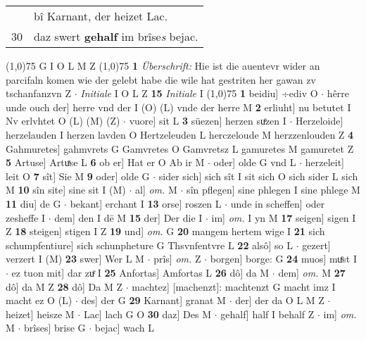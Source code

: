\documentclass[8pt,a4paper,notitlepage]{article}
\begin{document}
\begin{table}[ht]
\begin{minipage}[t]{0.5\linewidth}
\begin{tabular}{rl}
 & bî Karnant, der heizet Lac.\\ 
30 & daz swert \textbf{gehalf} im brîse\textit{s} bejac.\\ 
\end{tabular}
\scriptsize
\line(1,0){75} \newline
G I O L M Z \newline
\line(1,0){75} \newline
\textbf{1} \textit{Überschrift:} Hie ist die auentevr wider an parcifaln komen wie der gelebt habe die wile hat gestriten her gawan zv tschanfanzvn Z   $\cdot$ \textit{Initiale} I O L Z  \textbf{15} \textit{Initiale} I  \newline
\line(1,0){75} \newline
\textbf{1} beidiu] ÷ediv O  $\cdot$ hêrre unde ouch der] herre vnd der I (O) (L) vnde der herre M \textbf{2} erliuht] nu betutet I Nv erlvhtet O (L) (M) (Z)  $\cdot$ vuore] sit L \textbf{3} süezen] herzen suͤzen I  $\cdot$ Herzeloide] herzelauden I herzen lavden O Hertzeleuden L herczeloude M herzzenlouden Z \textbf{4} Gahmuretes] gahmvrets G Gamvretes O Gamvretsz L gamuretes M gamuretet Z \textbf{5} Artuse] Artuͯse L \textbf{6} ob er] Hat er O Ab ir M  $\cdot$ oder] olde G vnd L  $\cdot$ herzeleit] leit O \textbf{7} sît] Sie M \textbf{9} oder] olde G  $\cdot$ sider sich] sich sît I sit sich O sich sider L sich M \textbf{10} sîn site] sine sit I (M)  $\cdot$ al] \textit{om.} M  $\cdot$ sîn pflegen] sine phlegen I sine phlege M \textbf{11} diu] de G  $\cdot$ bekant] erchant I \textbf{13} orse] roszen L  $\cdot$ unde in scheffen] oder zesheffe I  $\cdot$ dem] den I dē M \textbf{15} der] Der die I  $\cdot$ im] \textit{om.} I yn M \textbf{17} seigen] sigen I Z \textbf{18} steigen] stigen I Z \textbf{19} und] \textit{om.} G \textbf{20} mangem hertem wige I \textbf{21} sich schumpfentiure] sich schunpheture G Thsvnfentvre L \textbf{22} alsô] so L  $\cdot$ gezert] verzert I (M) \textbf{23} swer] Wer L M  $\cdot$ prîs] \textit{om.} Z  $\cdot$ borgen] borge: G \textbf{24} muos] muͤst I  $\cdot$ ez tuon mit] dar zuͤ I \textbf{25} Anfortas] Amfortas L \textbf{26} dô] da M  $\cdot$ dem] \textit{om.} M \textbf{27} dô] da M Z \textbf{28} dô] Da M Z  $\cdot$ machtez] [machenzt]: machtenzt G macht imz I macht ez O (L)  $\cdot$ des] der G \textbf{29} Karnant] granat M  $\cdot$ der] der da O L M Z  $\cdot$ heizet] heisze M  $\cdot$ Lac] lach G O \textbf{30} daz] Des M  $\cdot$ gehalf] half I behalf Z  $\cdot$ im] \textit{om.} M  $\cdot$ brîses] brise G  $\cdot$ bejac] wach L \newline

\end{minipage}
\end{table}
\end{document}
